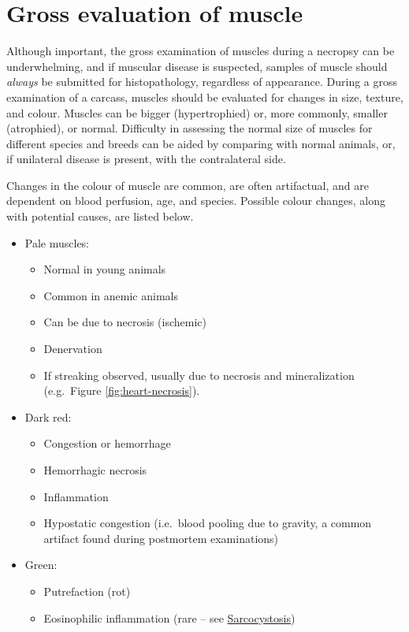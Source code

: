 \documentclass[openany]{report}
\providecommand{\tightlist}{%
  \setlength{\itemsep}{0pt}\setlength{\parskip}{0pt}}
\begin{document}
\section{Gross evaluation of muscle}\label{gross-evaluation-of-muscle}

Although important, the gross examination of muscles during a necropsy
can be underwhelming, and if muscular disease is suspected, samples of
muscle should \emph{always} be submitted for histopathology, regardless
of appearance. During a gross examination of a carcass, muscles should
be evaluated for changes in size, texture, and colour. Muscles can be
bigger (hypertrophied) or, more commonly, smaller (atrophied), or
normal. Difficulty in assessing the normal size of muscles for different
species and breeds can be aided by comparing with normal animals, or, if
unilateral disease is present, with the contralateral side.

Changes in the colour of muscle are common, are often artifactual, and
are dependent on blood perfusion, age, and species. Possible colour
changes, along with potential causes, are listed below.

\begin{itemize}
\tightlist
\item
  Pale muscles:

  \begin{itemize}
  \tightlist
  \item
    Normal in young animals
  \item
    Common in anemic animals
  \item
    Can be due to necrosis (ischemic)
  \item
    Denervation
  \item
    If streaking observed, usually due to necrosis and mineralization
    (e.g.~Figure \ref{fig:heart-necrosis}).
  \end{itemize}
\item
  Dark red:

  \begin{itemize}
  \tightlist
  \item
    Congestion or hemorrhage
  \item
    Hemorrhagic necrosis
  \item
    Inflammation
  \item
    Hypostatic congestion (i.e.~blood pooling due to gravity, a common
    artifact found during postmortem examinations)
  \end{itemize}
\item
  Green:

  \begin{itemize}
  \tightlist
  \item
    Putrefaction (rot)
  \item
    Eosinophilic inflammation (rare -- see
    \protect\hyperlink{sarcocystosis}{Sarcocystosis})
  \end{itemize}
\end{itemize}
\end{document}
